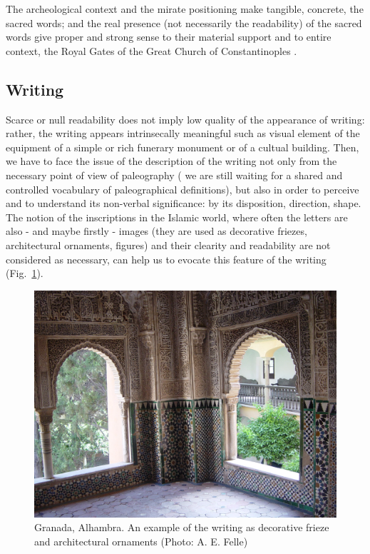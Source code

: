 \documentclass[amsthm,ebook]{saparticle}
\begin{document}
The archeological context and the mirate positioning make tangible, concrete, the sacred words; and the real presence
(not necessarily the readability) of the sacred words give proper and strong sense to their material support and to
entire context, the Royal Gates of the Great Church of Constantinoples \citep[320 and passim]{felle_esporre_2015}.




\subsection{Writing}


Scarce or null readability does not imply low quality of the appearance of writing: rather, the writing appears
intrinsecally meaningful such as visual element of the equipment of a simple or rich funerary monument or of a cultual
building. Then, we have to face the issue of the description of the writing not only from the necessary point of
view of paleography ( we are still waiting for a shared and controlled vocabulary of paleographical definitions), but
also in order to perceive and to understand its non-verbal significance: by its disposition, direction, shape. The
notion of the inscriptions in the Islamic world, where often the letters are also - and maybe firstly - images (they
are used as decorative friezes, architectural ornaments, figures) and their clearity and readability are not considered
as necessary, can help us to evocate this feature of the writing (Fig.~\ref{fig:10}).




\begin{figure}[!bp]
\centering
 \includegraphics[width=\columnwidth]{FelleVisualFeaturesofinscriptionsEAGLE2016FullPaper-img014.jpg}
\caption{Granada, Alhambra. An example of the writing as decorative frieze and architectural ornaments (Photo: A. E.
Felle)}
\label{fig:10}
\end{figure}
\end{document}
